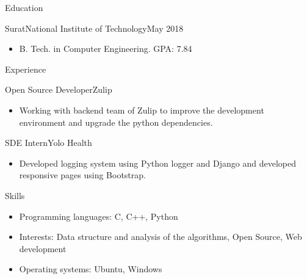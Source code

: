 \documentclass[]{mcdowellcv}
\begin{document}
\makeheader
\begin{cvsection}{Education}
	\begin{cvsubsection}{Surat}{National Institute of Technology}{May 2018}
		\begin{itemize}
			\item B. Tech. in Computer Engineering. GPA: 7.84
		\end{itemize}
	\end{cvsubsection}
\end{cvsection}
\begin{cvsection}{Experience}
	\begin{cvsubsection}{Open Source Developer}{Zulip}{}
		            
		\begin{itemize}%
			\item Working with backend team of Zulip to improve the development environment and upgrade the python dependencies.
		\end{itemize}
	\end{cvsubsection}
	\begin{cvsubsection}{SDE Intern}{Yolo Health}{}
		            
		\begin{itemize}%
			\item Developed logging system using Python logger and Django and developed responsive pages using Bootstrap.
		\end{itemize}
	\end{cvsubsection}
\end{cvsection}
\begin{cvsection}{Skills}
	\begin{cvsubsection}{}{}{}
		\begin{itemize}
			\item Programming languages:  C, C++, Python
			\item Interests:  Data structure and analysis of the algorithms, Open Source, Web development
			\item Operating systems:  Ubuntu, Windows
		\end{itemize}
	\end{cvsubsection}
\end{cvsection}
\end{document}
